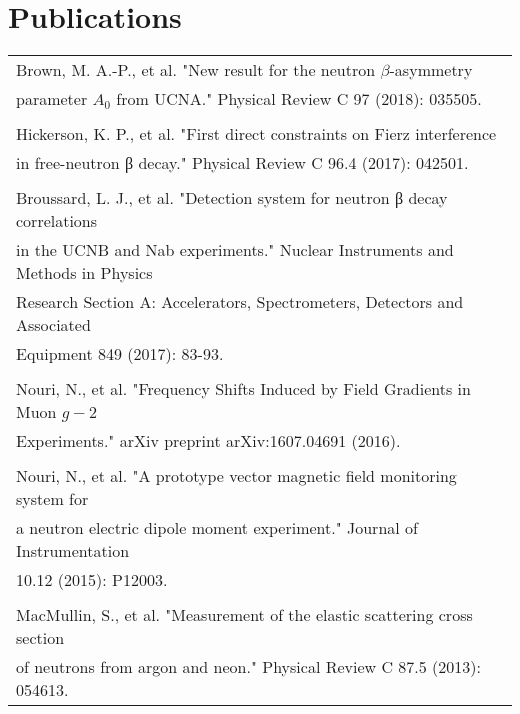 \documentclass[final]{ukthesis}
\begin{document}
\section*{Publications}
\begin{tabular} {l}
  Brown, M. A.-P., et al. "New result for the neutron $\beta$-asymmetry \\
  parameter $ A_0 $ from UCNA." Physical Review C 97 (2018): 035505. \\
  \\
  Hickerson, K. P., et al. "First direct constraints on Fierz interference \\
  in free-neutron β decay." Physical Review C 96.4 (2017): 042501.\\
  \\
  Broussard, L. J., et al. "Detection system for neutron β decay correlations\\
  in the UCNB and Nab experiments." Nuclear Instruments and Methods in Physics\\
  Research Section A: Accelerators, Spectrometers, Detectors and Associated\\
  Equipment 849 (2017): 83-93.\\
  \\
  Nouri, N., et al. "Frequency Shifts Induced by Field Gradients in Muon $g-2$\\
  Experiments." arXiv preprint arXiv:1607.04691 (2016).\\
  \\
  Nouri, N., et al. "A prototype vector magnetic field monitoring system for \\
  a neutron electric dipole moment experiment." Journal of Instrumentation\\
  10.12 (2015): P12003.\\
  \\
  MacMullin, S., et al. "Measurement of the elastic scattering cross section \\
  of neutrons from argon and neon." Physical Review C 87.5 (2013): 054613.
  
\end{tabular}
\end{document}
